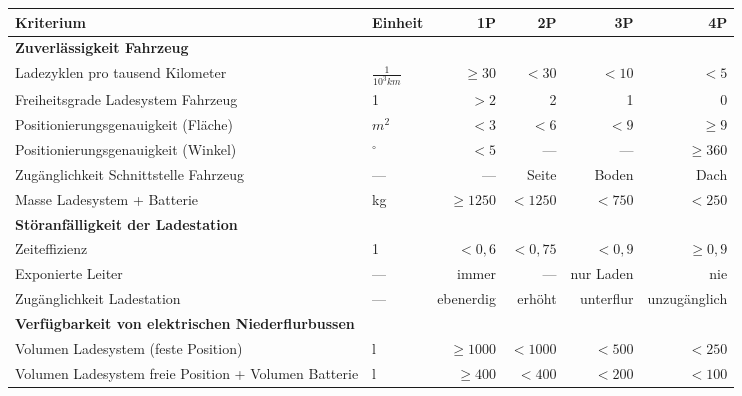 \begin{table}
	\centering
	\begin{tabulary}{\linewidth}{LLrrrr}
		\toprule
		Kriterium                                                & Einheit          &         1P &      2P &        3P &           4P \\ \midrule
		\textbf{Zuverlässigkeit Fahrzeug}                        &                  &            &         &           &  \\
		Ladezyklen pro tausend Kilometer                                 & $\frac{1}{10^{3}km}$   & $\ge 30$ & $<30$ &   $<10$ &     $<5$ \\
		Freiheitsgrade Ladesystem Fahrzeug                       & 1                &       $>2$ &       2 &         1 &            0 \\
		Positionierungsgenauigkeit (Fläche)                      & $m^2$            &       $<3$ &    $<6$ &      $<9$ &      $\ge 9$ \\
		Positionierungsgenauigkeit (Winkel)                      & $^\circ$         &       $<5$ &     --- &       --- &    $\ge 360$ \\
		Zugänglichkeit Schnittstelle Fahrzeug                    & ---              &        --- &   Seite &     Boden &         Dach \\
		Masse Ladesystem + Batterie                              & kg               & $\ge 1250$ & $<1250$ &    $<750$ &       $<250$ \\ \midrule
		\textbf{Störanfälligkeit der Ladestation}                &                  &            &         &           &  \\
		Zeiteffizienz                                            & 1                &  $<0,6$ &  $<0,75$ &    $<0,9$ &       $\ge 0,9$ \\
		Exponierte Leiter                                        & ---              &      immer &     --- & nur Laden &          nie \\
		Zugänglichkeit Ladestation                               & ---              &  ebenerdig &  erhöht & unterflur & unzugänglich \\ \midrule
		\textbf{Verfügbarkeit von elektrischen Niederflurbussen} &                  &            &         &           &  \\
		Volumen Ladesystem (feste Position)                      & l                & $\ge 1000$ & $<1000$ &    $<500$ &       $<250$ \\
		Volumen Ladesystem freie Position + Volumen Batterie     & l                &  $\ge 400$ &  $<400$ &    $<200$ &       $<100$ \\ \midrule

\end{tabulary}
\end{table}
